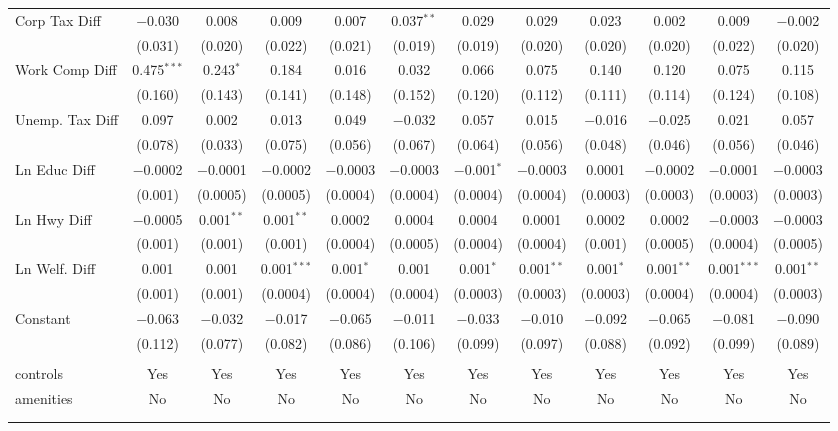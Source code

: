 \begin{table}[!htbp]
\begin{tabular}{@{\extracolsep{5pt}}lccccccccccc}
  Corp Tax Diff & $-$0.030 & 0.008 & 0.009 & 0.007 & 0.037$^{**}$ & 0.029 & 0.029 & 0.023 & 0.002 & 0.009 & $-$0.002 \\ 
  & (0.031) & (0.020) & (0.022) & (0.021) & (0.019) & (0.019) & (0.020) & (0.020) & (0.020) & (0.022) & (0.020) \\ 
  Work Comp Diff & 0.475$^{***}$ & 0.243$^{*}$ & 0.184 & 0.016 & 0.032 & 0.066 & 0.075 & 0.140 & 0.120 & 0.075 & 0.115 \\ 
  & (0.160) & (0.143) & (0.141) & (0.148) & (0.152) & (0.120) & (0.112) & (0.111) & (0.114) & (0.124) & (0.108) \\ 
  Unemp. Tax Diff & 0.097 & 0.002 & 0.013 & 0.049 & $-$0.032 & 0.057 & 0.015 & $-$0.016 & $-$0.025 & 0.021 & 0.057 \\ 
  & (0.078) & (0.033) & (0.075) & (0.056) & (0.067) & (0.064) & (0.056) & (0.048) & (0.046) & (0.056) & (0.046) \\ 
  Ln Educ Diff & $-$0.0002 & $-$0.0001 & $-$0.0002 & $-$0.0003 & $-$0.0003 & $-$0.001$^{*}$ & $-$0.0003 & 0.0001 & $-$0.0002 & $-$0.0001 & $-$0.0003 \\ 
  & (0.001) & (0.0005) & (0.0005) & (0.0004) & (0.0004) & (0.0004) & (0.0004) & (0.0003) & (0.0003) & (0.0003) & (0.0003) \\ 
  Ln Hwy Diff & $-$0.0005 & 0.001$^{**}$ & 0.001$^{**}$ & 0.0002 & 0.0004 & 0.0004 & 0.0001 & 0.0002 & 0.0002 & $-$0.0003 & $-$0.0003 \\ 
  & (0.001) & (0.001) & (0.001) & (0.0004) & (0.0005) & (0.0004) & (0.0004) & (0.001) & (0.0005) & (0.0004) & (0.0005) \\ 
  Ln Welf. Diff & 0.001 & 0.001 & 0.001$^{***}$ & 0.001$^{*}$ & 0.001 & 0.001$^{*}$ & 0.001$^{**}$ & 0.001$^{*}$ & 0.001$^{**}$ & 0.001$^{***}$ & 0.001$^{**}$ \\ 
  & (0.001) & (0.001) & (0.0004) & (0.0004) & (0.0004) & (0.0003) & (0.0003) & (0.0003) & (0.0004) & (0.0004) & (0.0003) \\ 
  Constant & $-$0.063 & $-$0.032 & $-$0.017 & $-$0.065 & $-$0.011 & $-$0.033 & $-$0.010 & $-$0.092 & $-$0.065 & $-$0.081 & $-$0.090 \\ 
  & (0.112) & (0.077) & (0.082) & (0.086) & (0.106) & (0.099) & (0.097) & (0.088) & (0.092) & (0.099) & (0.089) \\ 
 \hline \\[-1.8ex] 
controls & Yes & Yes & Yes & Yes & Yes & Yes & Yes & Yes & Yes & Yes & Yes \\ 
amenities & No & No & No & No & No & No & No & No & No & No & No \\ 
\hline \\[-1.8ex] 
\hline 
\hline \\[-1.8ex] 
\end{tabular} 
\end{table} 
